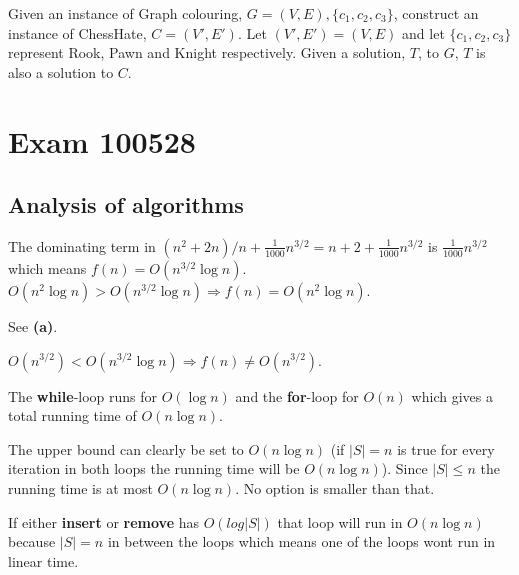 \documentclass[a4paper]{article}
\newenvironment{task}[1]
{
	\begin{description}[align=right]
		\item [#1]
}{		%
	\end{description}
}
\newcommand{\abs}[1]{\left|#1\right|}
\newcommand{\taskref}[1]{\textbf{#1}}
\DeclareMathOperator{\*}{\cdot}
\begin{document}
\begin{task}{(e)}
\end{task}

\begin{task}{(f)}
	\qquad Given an instance of Graph colouring, $G=(V,E),\{c_1,c_2,c_3\}$, construct an instance of ChessHate, $C=(V',E')$. Let $(V',E')=(V,E)$ and let $\{c_1,c_2,c_3\}$ represent Rook, Pawn and Knight respectively. Given a solution, $T$, to $G$, $T$ is also a solution to $C$. 
\end{task}

\pagebreak
\section*{Exam 100528}
\subsection*{Analysis of algorithms}

\begin{task}{1. (a)}
	 The dominating term in $(n^2+2n)/n+\frac{1}{1000}n^{3/2}=n+2+\frac{1}{1000}n^{3/2}$ is $\frac{1}{1000}n^{3/2}$ which means $f(n)=O(n^{3/2}\log n)$. $O(n^2\log n)>O(n^{3/2}\log n) \Rightarrow f(n)=O(n^2\log n)$.
\end{task}

\begin{task}{(b)}
 See \taskref{(a)}.
\end{task}

\begin{task}{(c)}
	 $O(n^{3/2})<O(n^{3/2}\log n) \Rightarrow f(n)\neq O(n^{3/2})$.
\end{task}

\begin{task}{2. (a)}
	 The \textbf{while}-loop runs for $O(\log n)$ and the \textbf{for}-loop for $O(n)$ which gives a total running time of $O(n\log n)$.
\end{task}

\begin{task}{3. (a)}
	 The upper bound can clearly be set to $O(n\log n)$ (if $\abs{S}=n$ is true for every iteration in both loops the running time will be $O(n\log n)$). Since $\abs{S}\leq n$ the running time is at most $O(n\log n)$. No option is smaller than that.
\end{task}

\begin{task}{(b)}
	 If either \textbf{insert} or \textbf{remove} has $O(log\abs{S})$ that loop will run in $O(n\log n)$ because $\abs{S}=n$ in between the loops which means one of the loops wont run in linear time.
\end{task}
\end{document}
